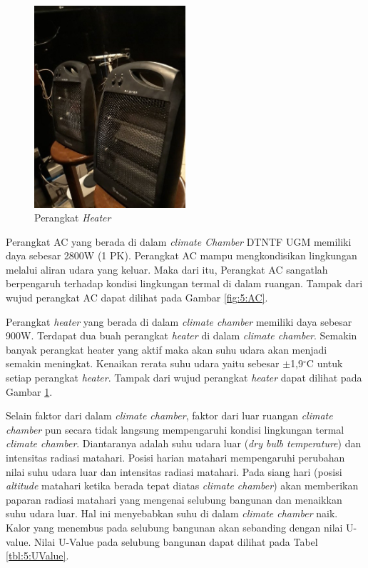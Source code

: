 \begin{figure}[!h]
	\centering
	\includegraphics[width=0.5\textwidth]{figures/Heater}
	\caption{Perangkat \textit{Heater}}
	\label{fig:5:Heater}
\end{figure}	

Perangkat AC yang berada di dalam \textit{climate Chamber} DTNTF UGM memiliki daya sebesar 2800W (1 PK). Perangkat AC mampu mengkondisikan lingkungan melalui aliran udara yang keluar. Maka dari itu, Perangkat AC sangatlah berpengaruh terhadap kondisi lingkungan termal di dalam ruangan. Tampak dari wujud perangkat AC dapat dilihat pada Gambar \ref{fig:5:AC}.

Perangkat \textit{heater} yang berada di dalam \textit{climate chamber} memiliki daya sebesar 900W. Terdapat dua buah perangkat \textit{heater} di dalam \textit{climate chamber}. Semakin banyak perangkat heater yang aktif maka akan suhu udara akan menjadi semakin meningkat. Kenaikan rerata suhu udara yaitu sebesar $\pm$1,9$^{\circ}$C untuk setiap perangkat \textit{heater}. Tampak dari wujud perangkat \textit{heater} dapat dilihat pada Gambar \ref{fig:5:Heater}.

Selain faktor dari dalam \textit{climate chamber}, faktor dari luar ruangan \textit{climate chamber} pun secara tidak langsung mempengaruhi kondisi lingkungan termal \textit{climate chamber}. Diantaranya adalah suhu udara luar (\textit{dry bulb temperature}) dan intensitas radiasi matahari. Posisi harian matahari mempengaruhi perubahan nilai suhu udara luar dan intensitas radiasi matahari. Pada siang hari (posisi \textit{altitude} matahari ketika berada tepat diatas \textit{climate chamber}) akan memberikan paparan radiasi matahari yang mengenai selubung bangunan dan menaikkan suhu udara luar. Hal ini menyebabkan suhu di dalam \textit{climate chamber} naik. Kalor yang menembus pada selubung bangunan akan sebanding dengan nilai U-value. Nilai U-Value pada selubung bangunan dapat dilihat pada Tabel \ref{tbl:5:UValue}.

